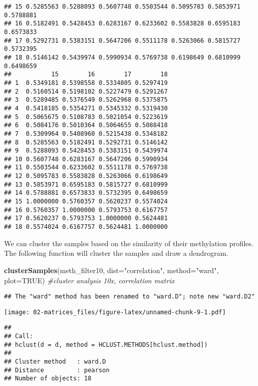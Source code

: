 \documentclass[]{article}
\newenvironment{Shaded}{\begin{snugshade}}{\end{snugshade}}
\newcommand{\KeywordTok}[1]{\textcolor[rgb]{0.13,0.29,0.53}{\textbf{#1}}}
\newcommand{\DataTypeTok}[1]{\textcolor[rgb]{0.13,0.29,0.53}{#1}}
\newcommand{\StringTok}[1]{\textcolor[rgb]{0.31,0.60,0.02}{#1}}
\newcommand{\CommentTok}[1]{\textcolor[rgb]{0.56,0.35,0.01}{\textit{#1}}}
\newcommand{\OtherTok}[1]{\textcolor[rgb]{0.56,0.35,0.01}{#1}}
\newcommand{\NormalTok}[1]{#1}
\begin{document}
\begin{verbatim}
## 15 0.5285563 0.5288093 0.5607748 0.5503544 0.5095783 0.5853971 0.5788881
## 16 0.5182491 0.5428453 0.6283167 0.6233602 0.5583828 0.6595183 0.6573833
## 17 0.5292731 0.5383151 0.5647206 0.5511178 0.5263066 0.5815727 0.5732395
## 18 0.5146142 0.5439974 0.5990934 0.5769738 0.6198649 0.6810999 0.6498659
##           15        16        17        18
## 1  0.5349181 0.5398558 0.5334805 0.5297419
## 2  0.5160514 0.5198102 0.5227479 0.5291267
## 3  0.5289485 0.5376549 0.5262968 0.5375875
## 4  0.5418185 0.5354271 0.5345332 0.5319430
## 5  0.5065675 0.5108783 0.5021054 0.5223619
## 6  0.5084176 0.5010364 0.5064655 0.5088418
## 7  0.5309964 0.5408960 0.5215438 0.5348182
## 8  0.5285563 0.5182491 0.5292731 0.5146142
## 9  0.5288093 0.5428453 0.5383151 0.5439974
## 10 0.5607748 0.6283167 0.5647206 0.5990934
## 11 0.5503544 0.6233602 0.5511178 0.5769738
## 12 0.5095783 0.5583828 0.5263066 0.6198649
## 13 0.5853971 0.6595183 0.5815727 0.6810999
## 14 0.5788881 0.6573833 0.5732395 0.6498659
## 15 1.0000000 0.5760357 0.5620237 0.5574024
## 16 0.5760357 1.0000000 0.5793753 0.6167757
## 17 0.5620237 0.5793753 1.0000000 0.5624481
## 18 0.5574024 0.6167757 0.5624481 1.0000000
\end{verbatim}

We can cluster the samples based on the similarity of their methylation
profiles. The following function will cluster the samples and draw a
dendrogram.

\begin{Shaded}
\begin{Highlighting}[]
\KeywordTok{clusterSamples}\NormalTok{(meth_filter10, }\DataTypeTok{dist=}\StringTok{"correlation"}\NormalTok{, }\DataTypeTok{method=}\StringTok{"ward"}\NormalTok{, }\DataTypeTok{plot=}\OtherTok{TRUE}\NormalTok{) }\CommentTok{#cluster analysis 10x, correlation matrix}
\end{Highlighting}
\end{Shaded}

\begin{verbatim}
## The "ward" method has been renamed to "ward.D"; note new "ward.D2"
\end{verbatim}

\texttt{[image: 02-matrices\_files/figure-latex/unnamed-chunk-9-1.pdf]}

\begin{verbatim}
## 
## Call:
## hclust(d = d, method = HCLUST.METHODS[hclust.method])
## 
## Cluster method   : ward.D 
## Distance         : pearson 
## Number of objects: 18
\end{verbatim}
\end{document}
